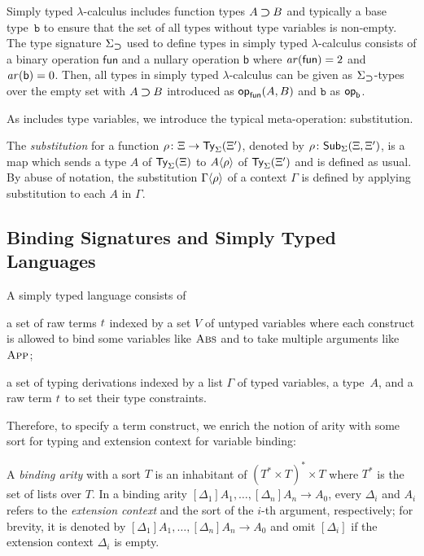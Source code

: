 \begin{example} \label{ex:type-signature-for-function-type}
  Simply typed $\lambda$-calculus includes function types $A \mathbin{\bm{\supset}} B$ and typically a base type~$\mathtt{b}$ to ensure that the set of all types without type variables is non-empty.
  The type signature $\Sigma_{\mathbin{\bm{\supset}}}$ used to define types in simply typed $\lambda$-calculus consists of a binary operation $\mathsf{fun}$ and a nullary operation $\mathsf{b}$ where $\mathit{ar}(\mathsf{fun}) = 2$ and $\mathit{ar}(\mathsf{b}) = 0$.
  Then, all types in simply typed $\lambda$-calculus can be given as $\Sigma_{\mathbin{\bm{\supset}}}$-types over the empty set with $A \mathbin{\bm{\supset}} B$ introduced as $\mathsf{op}_{\mathsf{fun}}(A, B)$ and $\mathtt{b}$ as $\mathsf{op}_{\mathsf{b}}$. 
\end{example}

As  includes type variables, we introduce the typical meta-operation: substitution.
\begin{definition}
  The \emph{substitution} for a function $\rho\colon \Xi \to \mathsf{Ty}_{\Sigma}(\Xi')$, denoted by $\rho\colon \mathsf{Sub}_{\Sigma}(\Xi,\Xi')$, is a map which sends a type $A$ of $\mathsf{Ty}_{\Sigma}(\Xi)$ to ${A}\!\left<{\rho}\right>$ of $\mathsf{Ty}_{\Sigma}(\Xi')$ and is defined as usual.
  By abuse of notation, the substitution ${\Gamma}\!\left<{\rho}\right>$ of a context $\Gamma$ is defined by applying substitution to each $A$ in $\Gamma$.
\end{definition}

\subsection{Binding Signatures and Simply Typed Languages} \label{subsec:binding-sig}

A simply typed language consists of
\begin{enumerate*}
  \item a set of raw terms $\isTerm{t}$ indexed by a set $V$ of untyped variables where each construct is allowed to bind some variables like $\textnormal{\textsc{Abs}}$ and to take multiple arguments like $\textnormal{\textsc{App}}$;
  \item a set of typing derivations indexed by a list $\Gamma$ of typed variables, a type~$A$, and a raw term $\isTerm{t}$ to set their type constraints. 
\end{enumerate*}
Therefore, to specify a term construct, we enrich the notion of arity with some sort for typing and extension context for variable binding:
\begin{definition}\label{def:binding-arity}
  A \emph{binding arity} with a sort $T$ is an inhabitant of $\left(T^* \times T\right)^* \times T$ where $T^*$ is the set of lists over $T$.
  In a binding arity ${[\Delta_1]A_{1}, \ldots, \left[\Delta_{n}\right] A_{n}} \to {A_0}$, every $\Delta_i$ and $A_i$ refers to the \emph{extension context} and the sort of the $i$-th argument, respectively; for brevity, it is denoted by ${[\Delta_1]A_{1}, \ldots, \left[\Delta_{n}\right] A_{n}} \to {A_0}$ and omit $[\Delta_i]$ if the extension context $\Delta_i$ is empty.
\end{definition}

